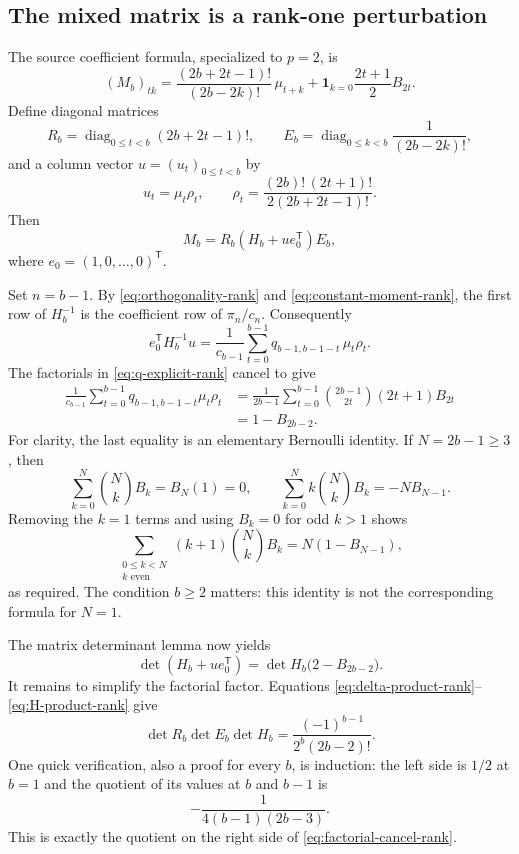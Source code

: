 \subsection{The mixed matrix is a rank-one perturbation}

The source coefficient formula, specialized to $p=2$, is
\begin{equation}\label{eq:rank-two-entry}
 (M_b)_{tk}
 =\frac{(2b+2t-1)!}{(2b-2k)!}\,\mu_{t+k}
   +\mathbf1_{k=0}\frac{2t+1}{2}B_{2t}.
\end{equation}
Define diagonal matrices
\[
 R_b=\operatorname{diag}_{0\leq t<b}(2b+2t-1)!,\qquad
 E_b=\operatorname{diag}_{0\leq k<b}\frac1{(2b-2k)!},
\]
and a column vector $u=(u_t)_{0\leq t<b}$ by
\[
 u_t=\mu_t\rho_t,\qquad
 \rho_t=\frac{(2b)!\,(2t+1)!}{2(2b+2t-1)!}.
\]
Then
\begin{equation}\label{eq:rank-one-factor}
 M_b=R_b(H_b+u e_0^{\mathsf T})E_b,
\end{equation}
where $e_0=(1,0,\ldots,0)^{\mathsf T}$.

Set $n=b-1$.  By \eqref{eq:orthogonality-rank} and
\eqref{eq:constant-moment-rank}, the first row of $H_b^{-1}$ is the
coefficient row of $\pi_n/c_n$.  Consequently
\begin{equation}\label{eq:contraction-rank}
 e_0^{\mathsf T}H_b^{-1}u
 =\frac1{c_{b-1}}\sum_{t=0}^{b-1}q_{b-1,b-1-t}\,\mu_t\rho_t.
\end{equation}
The factorials in \eqref{eq:q-explicit-rank} cancel to give
\begin{align}
 \frac1{c_{b-1}}\sum_{t=0}^{b-1}
       q_{b-1,b-1-t}\mu_t\rho_t
 &=\frac1{2b-1}\sum_{t=0}^{b-1}
       \binom{2b-1}{2t}(2t+1)B_{2t}\\
 &=1-B_{2b-2}.
       \label{eq:bernoulli-contraction-rank}
\end{align}
For clarity, the last equality is an elementary Bernoulli identity.
If $N=2b-1\geq3$, then
\[
 \sum_{k=0}^N\binom NkB_k=B_N(1)=0,
 \qquad
 \sum_{k=0}^Nk\binom NkB_k=-NB_{N-1}.
\]
Removing the $k=1$ terms and using $B_k=0$ for odd $k>1$ shows
\[
 \sum_{\substack{0\leq k<N\\ k\text{ even}}}
      (k+1)\binom NkB_k=N(1-B_{N-1}),
\]
as required.  The condition $b\geq2$ matters: this identity is not
the corresponding formula for $N=1$.

The matrix determinant lemma now yields
\[
 \det(H_b+u e_0^{\mathsf T})
 =\det H_b\bigl(2-B_{2b-2}\bigr).
\]
It remains to simplify the factorial factor.  Equations
\eqref{eq:delta-product-rank}--\eqref{eq:H-product-rank} give
\begin{equation}\label{eq:factorial-cancel-rank}
 \det R_b\det E_b\det H_b
 =\frac{(-1)^{b-1}}{2^b(2b-2)!}.
\end{equation}
One quick verification, also a proof for every $b$, is induction:
the left side is $1/2$ at $b=1$ and the quotient of its values at
$b$ and $b-1$ is
\[
 -\frac1{4(b-1)(2b-3)}.
\]
This is exactly the quotient on the right side of
\eqref{eq:factorial-cancel-rank}.

